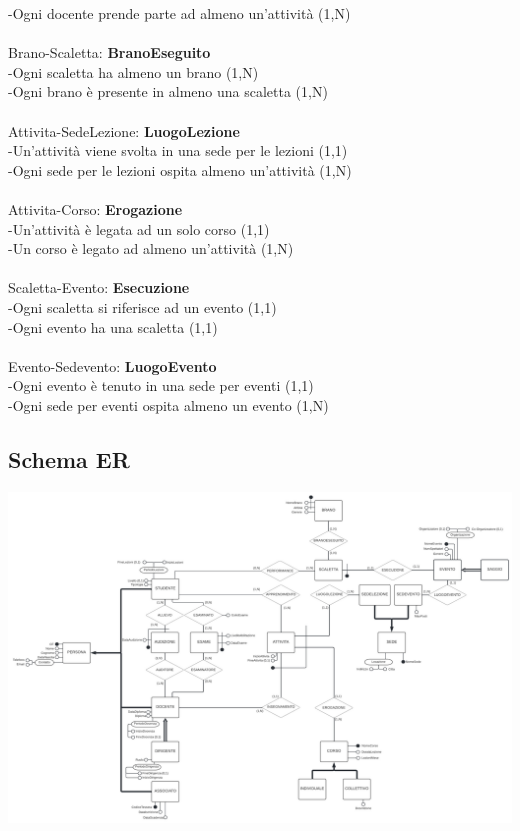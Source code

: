 \documentclass[11pt]{article}
\begin{document}
		-Ogni docente prende parte ad almeno un'attività (1,N)\\
		\\
		Brano-Scaletta: \textbf{BranoEseguito}\\
		-Ogni scaletta ha almeno un brano (1,N)\\
		-Ogni brano è presente in almeno una scaletta (1,N)\\
		\\
		Attivita-SedeLezione: \textbf{LuogoLezione}\\
		-Un'attività viene svolta in una sede per le lezioni (1,1)\\
		-Ogni sede per le lezioni ospita almeno un'attività (1,N)\\
		\\
		Attivita-Corso: \textbf{Erogazione}\\
		-Un'attività è legata ad un solo corso (1,1)\\
		-Un corso è legato ad almeno un'attività (1,N)\\
		\\
		Scaletta-Evento: \textbf{Esecuzione}\\
		-Ogni scaletta si riferisce ad un evento (1,1)\\
		-Ogni evento ha una scaletta (1,1)\\
		\\
		Evento-Sedevento: \textbf{LuogoEvento}\\
		-Ogni evento è tenuto in una sede per eventi (1,1)\\
		-Ogni sede per eventi ospita almeno un evento (1,N)\\
	\subsection{Schema ER}
		\includegraphics[scale=0.6]{../SchemaConcettuale/ERConcettuale.jpeg}
\end{document}
